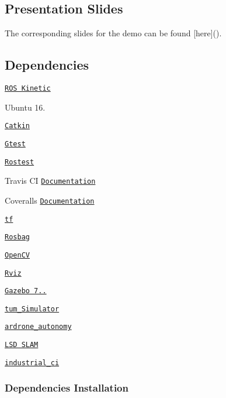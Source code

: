 \subsection*{Presentation Slides}

The corresponding slides for the demo can be found \mbox{[}here\mbox{]}().

\subsection*{Dependencies}


\begin{DoxyItemize}
\item \href{http://wiki.ros.org/kinetic/Installation}{\tt R\+OS Kinetic}
\item Ubuntu 16.
\item \href{http://wiki.ros.org/catkin}{\tt Catkin}
\item \href{http://wiki.ros.org/gtest}{\tt Gtest}
\item \href{http://wiki.ros.org/rostest}{\tt Rostest}
\item Travis CI \href{https://docs.travis-ci.com/user/for-beginners/}{\tt Documentation}
\item Coveralls \href{https://docs.coveralls.io/about-coveralls}{\tt Documentation}
\item \href{http://wiki.ros.org/tf}{\tt tf}
\item \href{http://wiki.ros.org/rosbag}{\tt Rosbag}
\item \href{https://opencv.org/license.html}{\tt Open\+CV}
\item \href{http://wiki.ros.org/rviz}{\tt Rviz}
\item \href{http://gazebosim.org/}{\tt Gazebo 7..}
\item \href{http://wiki.ros.org/tum_simulator}{\tt tum\+\_\+\+Simulator}
\item \href{https://ardrone-autonomy.readthedocs.io/en/latest/}{\tt ardrone\+\_\+autonomy}
\item \href{https://vision.in.tum.de/research/vslam/lsdslam}{\tt L\+SD S\+L\+AM}
\item \href{https://github.com/ros-industrial/industrial_ci}{\tt industrial\+\_\+ci}
\end{DoxyItemize}

\subsubsection*{Dependencies Installation}


